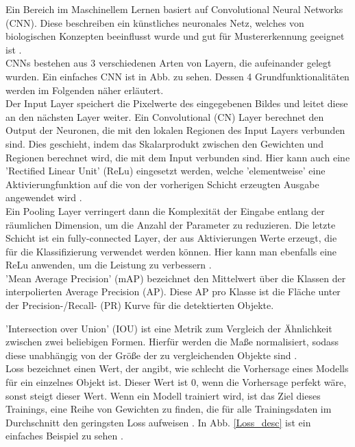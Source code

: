 {{	Ein Bereich im Maschinellem Lernen basiert auf Convolutional Neural Networks (CNN). Diese beschreiben ein künstliches neuronales Netz, welches von biologischen Konzepten beeinflusst wurde und gut für Mustererkennung geeignet ist \citep{Matsugu2003}. \\
	CNNs bestehen aus 3 verschiedenen Arten von Layern, die aufeinander gelegt wurden. Ein einfaches CNN ist in Abb.  zu sehen. Dessen 4 Grundfunktionalitäten werden im Folgenden näher erläutert. \\
	Der Input Layer speichert die Pixelwerte des eingegebenen Bildes und leitet diese an den nächsten Layer weiter. Ein Convolutional (CN) Layer berechnet den Output der Neuronen, die mit den lokalen Regionen des Input Layers verbunden sind. Dies geschieht, indem das Skalarprodukt zwischen den Gewichten und Regionen berechnet wird, die mit dem Input verbunden sind. Hier kann auch eine 'Rectified Linear Unit' (ReLu) eingesetzt werden, welche 'elementweise' eine Aktivierungfunktion auf die von der vorherigen Schicht erzeugten Ausgabe angewendet wird \citep{OSheaRyan2022}. \\
	Ein Pooling Layer verringert dann die Komplexität der Eingabe entlang der räumlichen Dimension, um die Anzahl der Parameter zu reduzieren. Die letzte Schicht ist ein fully-connected Layer, der aus Aktivierungen Werte erzeugt, die für die Klassifizierung verwendet werden können. Hier kann man ebenfalls eine ReLu anwenden, um die Leistung zu verbessern \citep{OSheaRyan2022}. \\

	'Mean Average Precision' (mAP) bezeichnet den Mittelwert über die Klassen der interpolierten Average Precision (AP). Diese AP pro Klasse ist die Fläche unter der Precision-/Recall- (PR) Kurve für die detektierten Objekte. %
	
	'Intersection over Union' (IOU) ist eine Metrik zum Vergleich der Ähnlichkeit zwischen zwei beliebigen Formen. Hierfür werden die Maße normalisiert, sodass diese unabhängig von der Größe der zu vergleichenden Objekte sind \citep{Rezatofighi2019}.  \\

	Loss bezeichnet einen Wert, der angibt, wie schlecht die Vorhersage eines Modells für ein einzelnes Objekt ist. Dieser Wert ist 0, wenn die Vorhersage perfekt wäre, sonst steigt dieser Wert. Wenn ein Modell trainiert wird, ist das Ziel dieses Trainings, eine Reihe von Gewichten zu finden, die für alle Trainingsdaten im Durchschnitt den geringsten Loss aufweisen \citep{loss_google}. In Abb. \ref{Loss_desc} ist ein einfaches Beispiel zu sehen \citep{loss_google}. \\

}}
